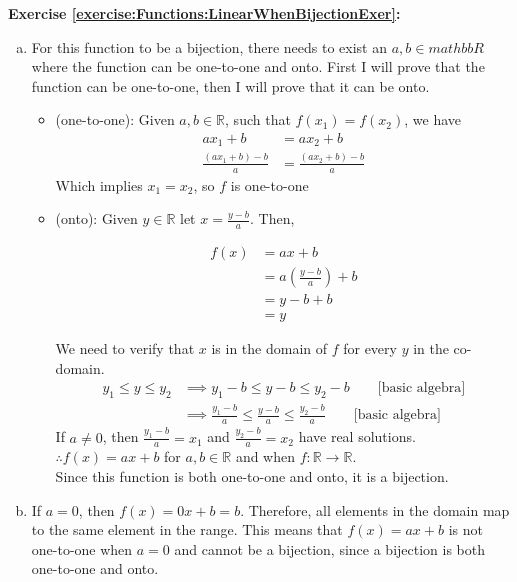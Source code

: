 \noindent\textbf{Exercise \ref{exercise:Functions:LinearWhenBijectionExer}:} %
\begin{enumerate}[(a)]
\item \label{LinearWhenBijectionExer-not0}
For this function to be a bijection, there needs to exist an $a,b\in mathbb{R}$ where the function can be one-to-one and onto. First I will prove that the function can be one-to-one, then I will prove that it can be onto.
	\begin{itemize}
	\item 
	(one-to-one): Given $a,b\in \mathbb{R}$, such that $f(x_{1}) = f(x_{2})$, we have
	\begin{align*}
	ax_{1} + b &= ax_{2} + b\\
	\frac{(ax_{1} + b) - b}{a} &= \frac{(ax_{2} + b) - b}{a}
	\end{align*}
	Which implies $x_{1} = x_{2}$, so $f$ is one-to-one
	
	\item
	(onto): Given $y\in \mathbb{R}$ let $x = \frac{y-b}{a}$. Then,
	\begin{center}
	\begin{align*}
	f(x) &= ax + b\\
	&= a(\frac{y-b}{a}) + b\\
	&= y - b + b\\
	&= y
	\end{align*}
	\end{center}
	We need to verify that $x$ is in the domain of $f$ for every $y$ in the co-domain.
	\begin{align*}
	y_{1}\le y\le y_{2}  &\implies y_{1} - b\le y - b\le y_{2} - b \qquad \text{[basic algebra]}\\
	&\implies  \frac{y_{1} - b}{a}\le \frac{y - b}{a}\le \frac{y_{2} - b}{a} \qquad \text{[basic algebra]}
	\end{align*}
	If $a\neq 0$, then $\frac{y_{1} - b}{a} = x_{1}$ and $\frac{y_{2} - b}{a} = x_{2}$ have real solutions.\\
	$\therefore f(x) = ax + b$ for $a,b\in \mathbb{R}$ and when $f\colon \mathbb{R}\to \mathbb{R}$.\\
	Since this function is both one-to-one and onto, it is a bijection.\\
	\end{itemize}

\item \label{LinearWhenBijectionExer-0}
If $a = 0$, then $f(x) = 0x + b = b$. Therefore, all elements in the domain map to the same element in the range. This means that $f(x) = ax + b$ is not one-to-one when $a = 0$ and cannot be a bijection, since a bijection is both one-to-one and onto.  
\end{enumerate}

